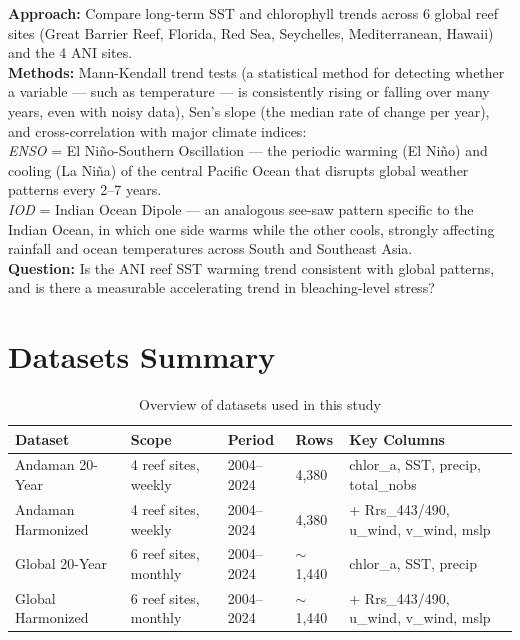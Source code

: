 \documentclass[12pt,a4paper]{report}
\begin{document}
\begin{infobox}
\textbf{Approach:} Compare long-term SST and chlorophyll trends across 6 global reef sites
(Great Barrier Reef, Florida, Red Sea, Seychelles, Mediterranean, Hawaii) and the 4 ANI
sites.\\[4pt]
\textbf{Methods:} Mann-Kendall trend tests (a statistical method for detecting whether
a variable — such as temperature — is consistently rising or falling over many years,
even with noisy data), Sen's slope (the median rate of change per year), and
cross-correlation with major climate indices:\\[4pt]
\quad\textit{ENSO} = El Ni\~no-Southern Oscillation — the periodic warming (El Ni\~no)
and cooling (La Ni\~na) of the central Pacific Ocean that disrupts global weather
patterns every 2--7 years.\\[2pt]
\quad\textit{IOD} = Indian Ocean Dipole — an analogous see-saw pattern specific to
the Indian Ocean, in which one side warms while the other cools, strongly affecting
rainfall and ocean temperatures across South and Southeast Asia.\\[4pt]
\textbf{Question:} Is the ANI reef SST warming trend consistent with global patterns,
and is there a measurable accelerating trend in bleaching-level stress?
\end{infobox}

\section{Datasets Summary}

\begin{table}[H]
\centering
\caption{Overview of datasets used in this study}
\begin{tabular}{L{3.5cm}L{3cm}C{1.8cm}C{1.8cm}L{4cm}}
\toprule
\textbf{Dataset} & \textbf{Scope} & \textbf{Period} & \textbf{Rows} & \textbf{Key Columns} \\
\midrule
{}
Andaman 20-Year & 4 reef sites, weekly & 2004--2024 & 4,380 & chlor\_a, SST, precip, total\_nobs \\
Andaman Harmonized & 4 reef sites, weekly & 2004--2024 & 4,380 & + Rrs\_443/490, u\_wind, v\_wind, mslp \\
Global 20-Year & 6 reef sites, monthly & 2004--2024 & $\sim$1,440 & chlor\_a, SST, precip \\
Global Harmonized & 6 reef sites, monthly & 2004--2024 & $\sim$1,440 & + Rrs\_443/490, u\_wind, v\_wind, mslp \\
\bottomrule
\end{tabular}
\label{tab:datasets}
\end{table}
\end{document}
